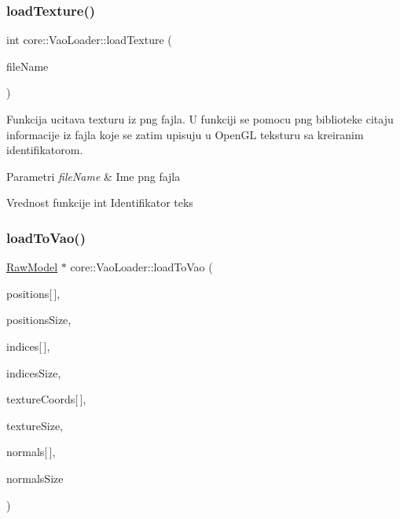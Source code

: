 \subsubsection{\texorpdfstring{load\+Texture()}{loadTexture()}}
{\footnotesize\ttfamily int core\+::\+Vao\+Loader\+::load\+Texture (\begin{DoxyParamCaption}\item[{const char $\ast$}]{file\+Name }\end{DoxyParamCaption})}



Funkcija ucitava texturu iz png fajla. U funkciji se pomocu png biblioteke citaju informacije iz fajla koje se zatim upisuju u Open\+GL teksturu sa kreiranim identifikatorom. 


\begin{DoxyParams}{Parametri}
{\em file\+Name} & Ime png fajla \\
\hline
\end{DoxyParams}
\begin{DoxyReturn}{Vrednost funkcije}
int Identifikator teks 
\end{DoxyReturn}
\mbox{\label{classcore_1_1VaoLoader_a61e0aea1c2f59726a2ea8ba323d32b67}} 
\subsubsection{\texorpdfstring{load\+To\+Vao()}{loadToVao()}}
{\footnotesize\ttfamily \hyperlink{classmodel_1_1RawModel}{Raw\+Model} $\ast$ core\+::\+Vao\+Loader\+::load\+To\+Vao (\begin{DoxyParamCaption}\item[{G\+Lfloat}]{positions\mbox{[}$\,$\mbox{]},  }\item[{G\+Lint}]{positions\+Size,  }\item[{G\+Lint}]{indices\mbox{[}$\,$\mbox{]},  }\item[{G\+Lint}]{indices\+Size,  }\item[{G\+Lfloat}]{texture\+Coords\mbox{[}$\,$\mbox{]},  }\item[{G\+Lint}]{texture\+Size,  }\item[{G\+Lfloat}]{normals\mbox{[}$\,$\mbox{]},  }\item[{G\+Lint}]{normals\+Size }\end{DoxyParamCaption})}




